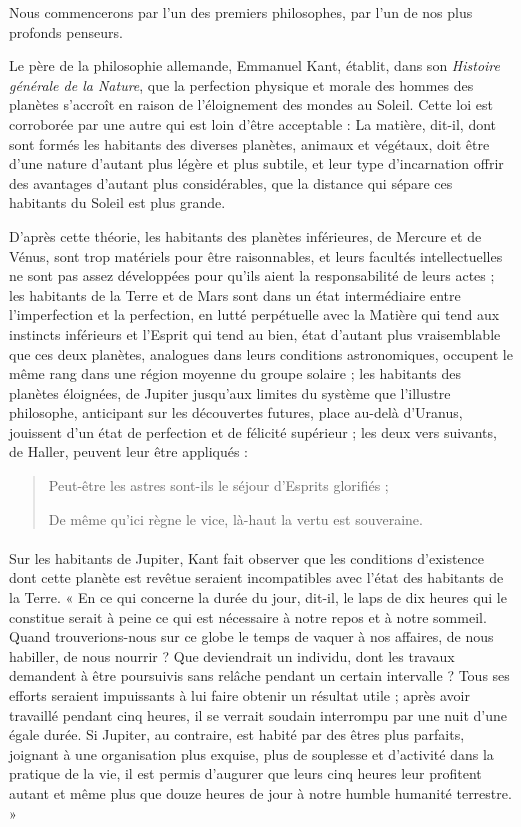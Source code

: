 \documentclass[a4paper, 11pt, oneside]{article}
\begin{document}
Nous commencerons par l'un des premiers philosophes, par l'un de nos plus profonds penseurs.

Le père de la philosophie allemande, Emmanuel Kant, établit, dans son \emph{Histoire générale de la Nature}, que la perfection physique et morale des hommes des planètes s'accroît en raison de l'éloignement des mondes au Soleil. Cette loi est corroborée par une autre qui est loin d'être acceptable : La matière, dit-il, dont sont formés les habitants des diverses planètes, animaux et végétaux, doit être d'une nature d'autant plus légère et plus subtile, et leur type d'incarnation offrir des avantages d'autant plus considérables, que la distance qui sépare ces habitants du Soleil est plus grande.

D'après cette théorie, les habitants des planètes inférieures, de Mercure et de Vénus, sont trop matériels pour être raisonnables, et leurs facultés intellectuelles ne sont pas assez développées pour qu'ils aient la responsabilité de leurs actes ; les habitants de la Terre et de Mars sont dans un état intermédiaire entre l'imperfection et la perfection, en lutté perpétuelle avec la Matière qui tend aux instincts inférieurs et l'Esprit qui tend au bien, état d'autant plus vraisemblable que ces deux planètes, analogues dans leurs conditions astronomiques, occupent le même rang dans une région moyenne du groupe solaire ; les habitants des planètes éloignées, de Jupiter jusqu'aux limites du système que l'illustre philosophe, anticipant sur les découvertes futures, place au-delà d'Uranus, jouissent d'un état de perfection et de félicité supérieur ; les deux vers suivants, de Haller, peuvent leur être appliqués :
\begin{quotation}
Peut-être les astres sont-ils le séjour d'Esprits glorifiés ;

De même qu'ici règne le vice, là-haut la vertu est souveraine.
\end{quotation}
\paragraph{}
Sur les habitants de Jupiter, Kant fait observer que les conditions d'existence dont cette planète est revêtue seraient incompatibles avec l'état des habitants de la Terre. « En ce qui concerne la durée du jour, dit-il, le laps de dix heures qui le constitue serait à peine ce qui est nécessaire à notre repos et à notre sommeil. Quand trouverions-nous sur ce globe le temps de vaquer à nos affaires, de nous habiller, de nous nourrir ? Que deviendrait un individu, dont les travaux demandent à être poursuivis sans relâche pendant un certain intervalle ? Tous ses efforts seraient impuissants à lui faire obtenir un résultat utile ; après avoir travaillé pendant cinq heures, il se verrait soudain interrompu par une nuit d'une égale durée. Si Jupiter, au contraire, est habité par des êtres plus parfaits, joignant à une organisation plus exquise, plus de souplesse et d'activité dans la pratique de la vie, il est permis d'augurer que leurs cinq heures leur profitent autant et même plus que douze heures de jour à notre humble humanité terrestre. »
\end{document}
